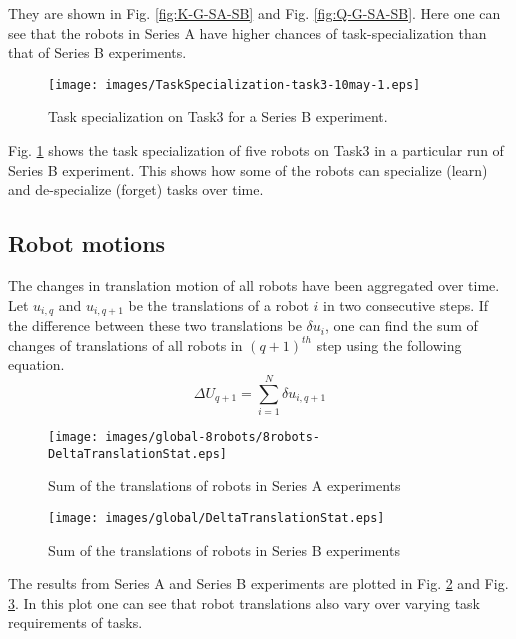 They are shown in Fig. \ref{fig:K-G-SA-SB} and Fig. \ref{fig:Q-G-SA-SB}. Here one can see that the robots in Series A have higher chances of task-specialization than that of Series B experiments.

\begin{figure}[H]
\centering
\texttt{[image: images/TaskSpecialization-task3-10may-1.eps]}
\caption{Task specialization on Task3 for a Series B experiment.}
\label{fig:k-single-task-SB} 
\end{figure}
Fig. \ref{fig:k-single-task-SB} shows the task specialization of five robots on Task3 in a particular run of Series B experiment. This shows how some of the robots can specialize (learn) and de-specialize (forget) tasks over time.
\subsection*{Robot motions}
The changes in translation motion of all robots  have been aggregated over time. Let $u_{i,q}$ and $u_{i,q+1}$ be the translations of a robot $i$ in two consecutive steps. If the difference between these two translations be $\delta u_{i}$, one can find the sum of changes of translations of all robots in $(q+1)^{th}$ step using the following equation.
\begin{equation}
\Delta U_{q+1} = \sum_{i=1}^{N} \delta u_{i, q+1} 
\label{eqn:Delta-Tr}
\end{equation}
\begin{figure}[H]
\centering
\texttt{[image: images/global-8robots/8robots-DeltaTranslationStat.eps]}
\caption{\small Sum of the translations of robots in Series A experiments}
\label{fig:translation-stat-SA} %
\end{figure}
\begin{figure}[H]
\centering
\texttt{[image: images/global/DeltaTranslationStat.eps]}
\caption{\small Sum of the translations of robots in Series B experiments}
\label{fig:translation-stat-SB} %
\end{figure}
The results from Series A and Series B experiments are plotted in Fig. \ref{fig:translation-stat-SA} and Fig. \ref{fig:translation-stat-SB}. In this plot one can see that robot translations also vary over varying task requirements of tasks.

